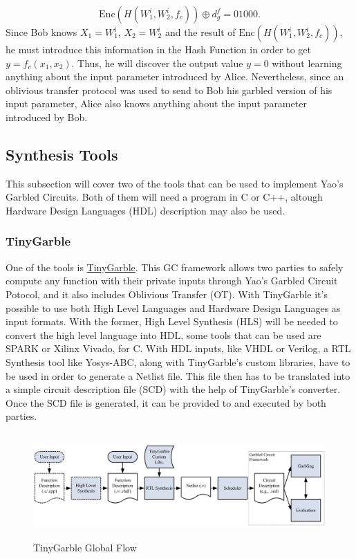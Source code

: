 \begin{refsection}
\begin{equation}\label{eq:decryptiongarbled}
  \textrm{Enc}(H(W_1^i,W_2^i,f_c ))\oplus d_g^f = 0 1 0 0 0.
\end{equation}
Since Bob knows $X_1 = W_1^i$, $X_2=W_2^i$ and the result of $\textrm{Enc}(H(W_1^i,W_2^i,f_c ))$, he must introduce this information in the Hash Function in order to get $y=f_c(x_1,x_2)$. Thus, he will discover the output value $y=0$ without learning anything about the input parameter introduced by Alice. Nevertheless, since an oblivious transfer protocol was used to send to Bob his garbled version of his input parameter, Alice also knows anything about the input parameter introduced by Bob.

\newpage

\subsection{Synthesis Tools}

This subsection will cover two of the tools that can be used to implement Yao's Garbled Circuits. Both of them will need a program in C or C++, altough Hardware Design Languages (HDL) description may also be used.

\subsubsection{TinyGarble}

One of the tools is \href{https://github.com/esonghori/TinyGarble}{TinyGarble}. This GC framework allows two parties to safely compute any function with their private inputs through Yao's Garbled Circuit Potocol, and it also includes Oblivious Transfer (OT).
With TinyGarble it's possible to use both High Level Languages and Hardware Design Languages as input formats. With the former, High Level Synthesis (HLS) will be needed to convert the high level language into HDL, some tools that can be used are SPARK or Xilinx Vivado, for C.
With HDL inputs, like VHDL or Verilog, a  RTL Synthesis tool like Yosys-ABC, along with TinyGarble's custom libraries, have to be used in order to generate a Netlist file. This file then has to be translated into a simple circuit description file (SCD) with the help of TinyGarble's converter.
Once the SCD file is generated, it can be provided to and executed by both parties.

\begin{figure}[H]
	\centering
	\includegraphics[width=1\textwidth, height=4cm]{./sdf/secure_multiparty_computation/figures/tiny_garble_flow.png}
    \caption{TinyGarble Global Flow\cite{TinyGarble}}\label{fig:tinygarble_flow}
\end{figure}


\end{refsection}
